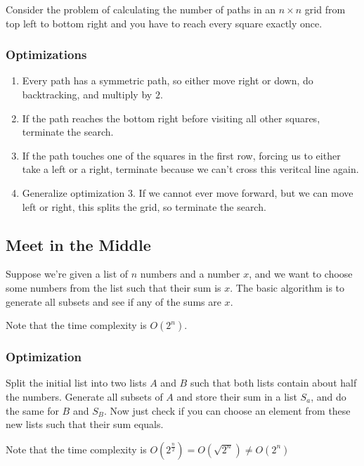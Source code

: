 \documentclass[12pt]{scrartcl}
\begin{document}
Consider the problem of calculating the number of paths in an $n \times n$
grid from top left to bottom right and you have to reach every square exactly
once.

\subsubsection{Optimizations}

\begin{enumerate}
  \item Every path has a symmetric path, so either move right or down, do
backtracking, and multiply by $2$.
  \item If the path reaches the bottom right before visiting all other squares, terminate the search.
  \item If the path touches one of the squares in the first row, forcing us to either take a left or a right, 
terminate because we can't cross this veritcal line again.
  \item Generalize optimization 3. If we cannot ever move forward, but we can move left or right, 
  this splits the grid, so terminate the search.
\end{enumerate}

\subsection{Meet in the Middle}

Suppose we're given a list of $n$ numbers and a number $x$, and we want to choose some numbers 
from the list such that their sum is $x$. The basic algorithm is to generate all 
subsets and see if any of the sums are $x$.
\begin{note}
  Note that the time complexity is $O(2^n)$.
\end{note}

\subsubsection{Optimization}

Split the initial list into two lists $A$ and $B$ such that both lists contain 
about half the numbers. Generate all subsets of $A$ and store their sum in a 
list $S_a$, and do the same for $B$ and $S_B$. Now just check if you can 
choose an element from these new lists such that their sum equals.

\begin{note}
  Note that the time complexity is $O(2^{\frac{n}{2}}) = O(\sqrt{2^n}) \neq O(2^n)$
\end{note}
\end{document}

